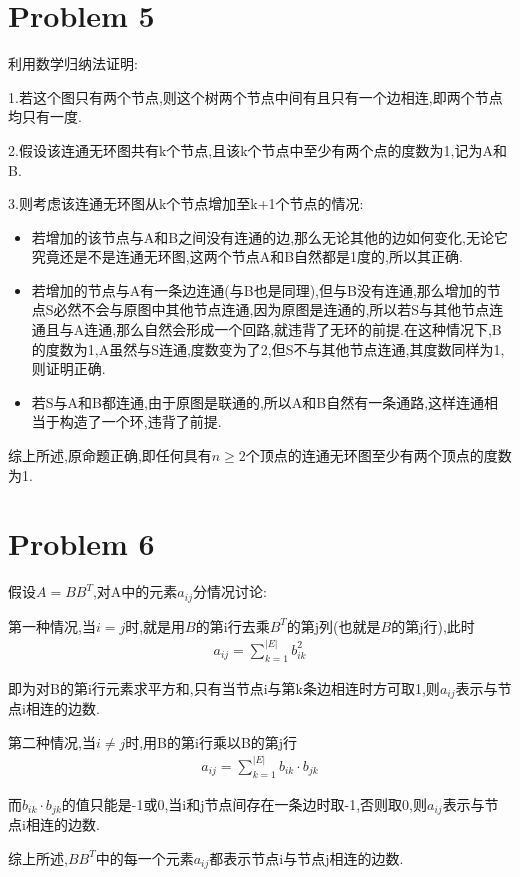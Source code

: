 \documentclass[12pt,a4paper,fontset=none]{ctexart}
\begin{document}
\section{Problem 5}
利用数学归纳法证明:

1.若这个图只有两个节点,则这个树两个节点中间有且只有一个边相连,即两个节点均只有一度.

2.假设该连通无环图共有k个节点,且该k个节点中至少有两个点的度数为1,记为A和B.

3.则考虑该连通无环图从k个节点增加至k+1个节点的情况:
\begin{itemize}
	\item 若增加的该节点与A和B之间没有连通的边,那么无论其他的边如何变化,无论它究竟还是不是连通无环图,这两个节点A和B自然都是1度的,所以其正确.
	\item 若增加的节点与A有一条边连通(与B也是同理),但与B没有连通,那么增加的节点S必然不会与原图中其他节点连通,因为原图是连通的,所以若S与其他节点连通且与A连通,那么自然会形成一个回路,就违背了无环的前提.在这种情况下,B的度数为1,A虽然与S连通,度数变为了2,但S不与其他节点连通,其度数同样为1,则证明正确.
	\item 若S与A和B都连通,由于原图是联通的,所以A和B自然有一条通路,这样连通相当于构造了一个环,违背了前提.
\end{itemize}

综上所述,原命题正确,即任何具有$n\geq 2$个顶点的连通无环图至少有两个顶点的度数为1.

\section{Problem 6}
假设$A=BB^T$,对A中的元素$a_{ij}$分情况讨论:

第一种情况,当$i=j$时,就是用$B$的第i行去乘$B^T$的第j列(也就是$B$的第j行),此时
\begin{align*}
	a_{ij}=\sum_{k=1}^{|E|}b_{ik}^2
\end{align*}

即为对B的第i行元素求平方和,只有当节点i与第k条边相连时方可取1,则$a_{ij}$表示与节点i相连的边数.

第二种情况,当$i\neq j$时,用B的第i行乘以B的第j行
\begin{align*}
	a_{ij}=\sum_{k=1}^{|E|}b_{ik}\cdot b_{jk}
\end{align*}

而$b_{ik}\cdot b_{jk}$的值只能是-1或0,当i和j节点间存在一条边时取-1,否则取0,则$a_{ij}$表示与节点i相连的边数.

综上所述,$BB^T$中的每一个元素$a_{ij}$都表示节点i与节点j相连的边数.
\end{document}
